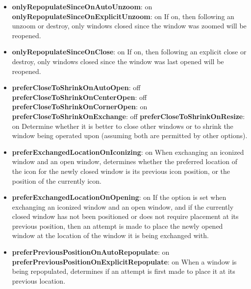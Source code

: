 \begin{itemize}
\item {\bf onlyRepopulateSinceOnAutoUnzoom}: on\newline{}
{\bf onlyRepopulateSinceOnExplicitUnzoom}: on\newline{}
If on, then following an unzoom or destroy, only windows closed
since the window was zoomed will be reopened.

\item {\bf onlyRepopulateSinceOnClose}: on\newline{}
If on, then following an explicit close or destroy, only windows
closed since the window was last opened will be reopened.

\item {\bf preferCloseToShrinkOnAutoOpen}: off\newline{}
{\bf preferCloseToShrinkOnCenterOpen}: off\newline{}
{\bf preferCloseToShrinkOnCornerOpen}: on\newline{}
{\bf preferCloseToShrinkOnExchange}: off\newline{}
{\bf preferCloseToShrinkOnResize}: on\newline{}
Determine whether it is better to close other windows or to
shrink the window being operated upon (assuming both are
permitted by other options).

\item {\bf preferExchangedLocationOnIconizing}: on\newline{}
When exchanging an iconized window and an open window, determines
whether the preferred location of the icon for the newly closed
window is its previous icon position, or the position of the
currently icon.

\item {\bf preferExchangedLocationOnOpening}: on\newline{}
If the option is set when exchanging an iconized window and an
open window, and if the currently closed window has not been
positioned or does not require placement at its previous
position, then an attempt is made to place the newly opened
window at the location of the window it is being exchanged with.

\item {\bf preferPreviousPositionOnAutoRepopulate}: on\newline{}
{\bf preferPreviousPositionOnExplicitRepopulate}: on\newline{}
When a window is being repopulated, determines if an attempt is
first made to place it at its previous location.


\end{itemize}
